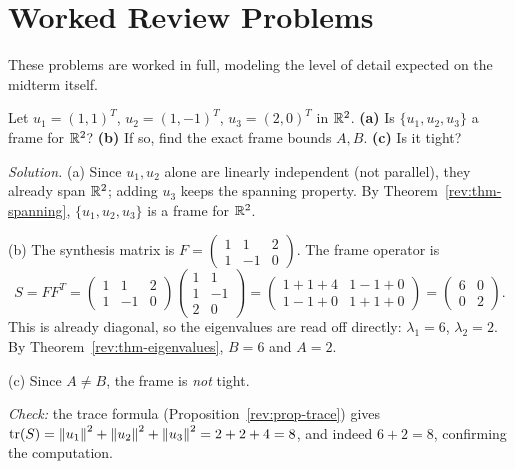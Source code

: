 \section{Worked Review Problems}
\label{sec:worked-review}

These problems are worked in full, modeling the level of detail expected
on the midterm itself.

\begin{examplebox}[title={Review Problem 1: Is it a frame? Find the bounds.}]
\label{rev:problem1}
Let $u_1=(1,1)^T$, $u_2=(1,-1)^T$, $u_3=(2,0)^T$ in $\mathbb{R}^2$.
\textbf{(a)} Is $\{u_1,u_2,u_3\}$ a frame for $\mathbb{R}^2$? \textbf{(b)} If
so, find the exact frame bounds $A,B$. \textbf{(c)} Is it tight?

\smallskip
\textit{Solution.} (a) Since $u_1,u_2$ alone are linearly independent
(not parallel), they already span $\mathbb{R}^2$; adding $u_3$ keeps the
spanning property. By Theorem~\ref{rev:thm-spanning}, $\{u_1,u_2,u_3\}$
is a frame for $\mathbb{R}^2$.

(b) The synthesis matrix is $F=\begin{pmatrix}1&1&2\\1&-1&0\end{pmatrix}$.
The frame operator is
\[
  S = FF^T = \begin{pmatrix}1&1&2\\1&-1&0\end{pmatrix}
  \begin{pmatrix}1&1\\1&-1\\2&0\end{pmatrix}
  = \begin{pmatrix}1+1+4 & 1-1+0\\1-1+0&1+1+0\end{pmatrix}
  = \begin{pmatrix}6&0\\0&2\end{pmatrix}.
\]
This is already diagonal, so the eigenvalues are read off directly:
$\lambda_1=6$, $\lambda_2=2$. By Theorem~\ref{rev:thm-eigenvalues},
$B=6$ and $A=2$.

(c) Since $A\ne B$, the frame is \emph{not} tight.

\textit{Check:} the trace formula (Proposition~\ref{rev:prop-trace})
gives $\operatorname{tr}(S)=\left\| u_1 \right\|^2+\left\| u_2 \right\|^2+\left\| u_3 \right\|^2=2+2+4=8$, and
indeed $6+2=8$, confirming the computation.
\end{examplebox}

